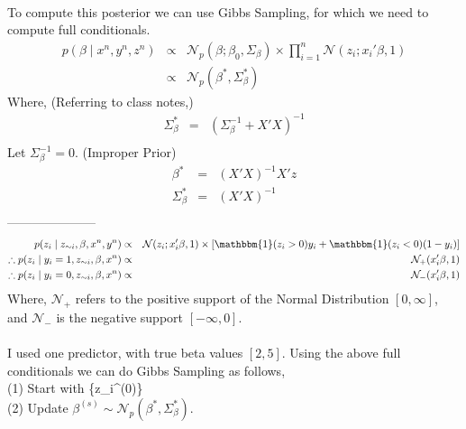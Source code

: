 \documentclass{article}
\begin{document}
\pagebreak

\\

To compute this posterior we can use Gibbs Sampling, for which we need to compute full conditionals. 
\begin{eqnarray*}
p(\beta \mid x^n,y^n,z^n) &\propto& \mathcal{N}_p(\beta;\beta_0,\Sigma_{\beta}) \times \prod_{i=1}^n{\mathcal{N}(z_i;x_i'\beta,1)}\\
&\propto& \mathcal{N}_p(\beta^*,\Sigma_{\beta}^*)
\end{eqnarray*}
Where, (Referring to class notes,)
\begin{eqnarray*}
\Sigma_{\beta}^* &=& (\Sigma_{\beta}^{-1} + X'X)^{-1}\\
\end{eqnarray*}
Let $\Sigma_{\beta}^{-1} = 0.$ (Improper Prior)
\begin{eqnarray*}
\beta^* &=& (X'X)^{-1}X'z\\
\Sigma_{\beta}^* &=& (X'X)^{-1}\\
\end{eqnarray*}
---------------------\\
\begin{eqnarray*}
p(z_i \mid z_{\sim i},\beta,x^n,y^n) &\propto& \mathcal{N}(z_i;x_i'\beta,1) \times \left[\mathbbm{1}(z_i > 0)y_i + \mathbbm{1}(z_i < 0)(1-y_i)\right]\\
\therefore p(z_i \mid y_i = 1,z_{\sim i},\beta,x^n) &\propto& \mathcal{N}_+(x_i'\beta,1)\\
\therefore p(z_i \mid y_i = 0,z_{\sim i},\beta,x^n) &\propto& \mathcal{N}_-(x_i'\beta,1)\\
\end{eqnarray*}
Where, $\mathcal{N}_+$ refers to the positive support of the Normal Distribution $[0,\infty]$, and $\mathcal{N}_-$ is the negative support $[-\infty,0].$\\

\\
I used one predictor, with true beta values $[2,5].$ Using the above full conditionals we can do Gibbs Sampling as follows,\\

(1) Start with \{z_i^{(0)}\}\\

(2) Update $\beta^{(s)} \sim \mathcal{N}_p(\beta^*,\Sigma_{\beta}^*).$\\
\end{document}
